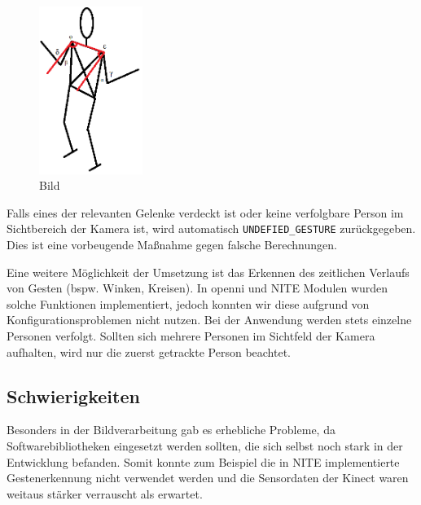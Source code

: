 \begin{figure}
	\centering
	\includegraphics[width=0.3\textwidth]{graphics/BILD-Winkel.png}
	\caption{Bild}
	\label{fig:gestenerkennung_umsetzung_winkel}
\end{figure}

Falls eines der relevanten Gelenke verdeckt ist oder keine verfolgbare Person im
Sichtbereich der Kamera ist, wird automatisch \lstinline{UNDEFIED_GESTURE}
zurückgegeben. Dies ist eine vorbeugende Maßnahme gegen falsche Berechnungen.

Eine weitere Möglichkeit der Umsetzung ist das Erkennen des zeitlichen Verlaufs von Gesten (bspw. Winken, Kreisen).
 In \gls{openni} und NITE Modulen wurden solche Funktionen implementiert, jedoch konnten wir diese aufgrund von Konfigurationsproblemen nicht nutzen.
Bei der Anwendung werden stets einzelne Personen verfolgt. Sollten sich mehrere Personen im Sichtfeld der Kamera aufhalten, wird nur die zuerst getrackte Person beachtet.

\subsection{Schwierigkeiten}

 Besonders in der Bildverarbeitung gab es erhebliche Probleme, da Softwarebibliotheken eingesetzt werden sollten,
 die sich selbst noch stark in der Entwicklung befanden. Somit konnte zum Beispiel die in NITE implementierte Gestenerkennung
 nicht verwendet werden und die Sensordaten der Kinect waren weitaus stärker verrauscht als erwartet.
 
